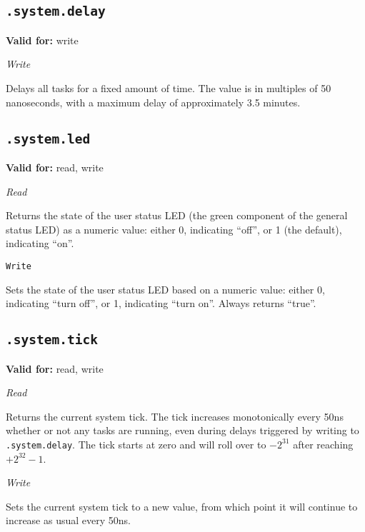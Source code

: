 \documentclass{article}
\begin{document}
\subsection{\texttt{.system.delay}}
\textbf{Valid for:} write

\textit{Write}

Delays all tasks for a fixed amount of time. The value is in multiples of 50 nanoseconds, with a maximum delay of approximately 3.5 minutes.

\subsection{\texttt{.system.led}}
\textbf{Valid for:} read, write

\textit{Read}

Returns the state of the user status LED (the green component of the general status LED) as a numeric value: either 0, indicating ``off'', or 1 (the default), indicating ``on''.

\texttt{Write}

Sets the state of the user status LED based on a numeric value: either 0, indicating ``turn off'', or 1, indicating ``turn on''. Always returns ``true''.

\subsection{\texttt{.system.tick}}
\textbf{Valid for:} read, write

\textit{Read}

Returns the current system tick. The tick increases monotonically every 50ns whether or not any tasks are running, even during delays triggered by writing to \texttt{.system.delay}. The tick starts at zero and will roll over to $-2^{31}$ after reaching $+2^{32}-1$.

\textit{Write}

Sets the current system tick to a new value, from which point it will continue to increase as usual every 50ns.
\end{document}
